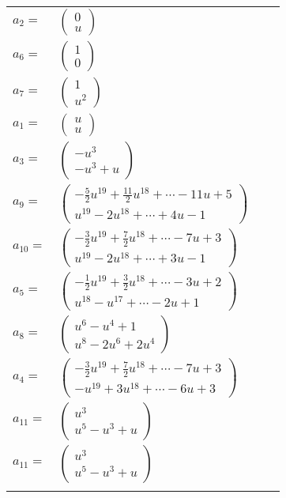 \documentclass[1p]{elsarticle_modified}
\theoremstyle{definition}
\begin{document}
\begin{tabular}{m{7pt} m{180pt} m{7pt} m{180pt} }
\flushright $a_{2}=$&$\begin{pmatrix}0\\u\end{pmatrix}$ \\
\flushright $a_{6}=$&$\begin{pmatrix}1\\0\end{pmatrix}$ \\
\flushright $a_{7}=$&$\begin{pmatrix}1\\u^2\end{pmatrix}$ \\
\flushright $a_{1}=$&$\begin{pmatrix}u\\u\end{pmatrix}$ \\
\flushright $a_{3}=$&$\begin{pmatrix}- u^3\\- u^3+u\end{pmatrix}$ \\
\flushright $a_{9}=$&$\begin{pmatrix}-\frac{5}{2} u^{19}+\frac{11}{2} u^{18}+\cdots-11 u+5\\u^{19}-2 u^{18}+\cdots+4 u-1\end{pmatrix}$ \\
\flushright $a_{10}=$&$\begin{pmatrix}-\frac{3}{2} u^{19}+\frac{7}{2} u^{18}+\cdots-7 u+3\\u^{19}-2 u^{18}+\cdots+3 u-1\end{pmatrix}$ \\
\flushright $a_{5}=$&$\begin{pmatrix}-\frac{1}{2} u^{19}+\frac{3}{2} u^{18}+\cdots-3 u+2\\u^{18}- u^{17}+\cdots-2 u+1\end{pmatrix}$ \\
\flushright $a_{8}=$&$\begin{pmatrix}u^6- u^4+1\\u^8-2 u^6+2 u^4\end{pmatrix}$ \\
\flushright $a_{4}=$&$\begin{pmatrix}-\frac{3}{2} u^{19}+\frac{7}{2} u^{18}+\cdots-7 u+3\\- u^{19}+3 u^{18}+\cdots-6 u+3\end{pmatrix}$ \\
\flushright $a_{11}=$&$\begin{pmatrix}u^3\\u^5- u^3+u\end{pmatrix}$\\ \flushright $a_{11}=$&$\begin{pmatrix}u^3\\u^5- u^3+u\end{pmatrix}$\\&\end{tabular}
\end{document}
